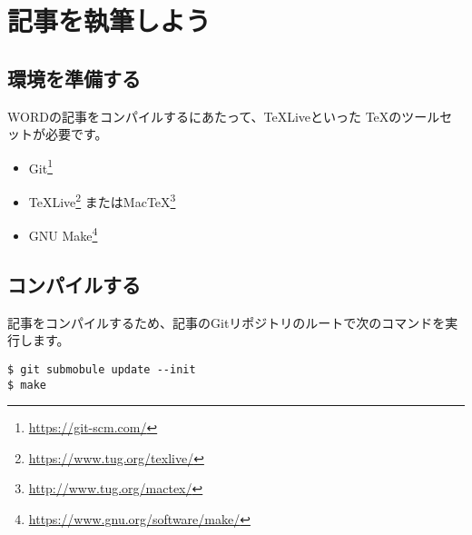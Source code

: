 \documentclass[../../main]{subfiles}
\begin{document}
\lstset{
  basicstyle=\ttfamily,
  commentstyle=\textit,
  frame=trBL,
  numbers=left,
  breaklines=true,
  title=\lstname,
}



\renewcommand{\thelstlisting}{\arabic{lstlisting}}

\subtitle{ヘッダの見出し}


\author{情報 太郎}

\chapter{記事を執筆しよう}

\section{環境を準備する}

WORDの記事をコンパイルするにあたって、\TeX Liveといった
\TeX のツールセットが必要です。

\begin{itemize}
  \item Git\footnote{\url{https://git-scm.com/}}
  \item \TeX Live\footnote{\url{https://www.tug.org/texlive/}}
  またはMac\TeX\footnote{\url{http://www.tug.org/mactex/}}
  \item GNU Make\footnote{\url{https://www.gnu.org/software/make/}}
\end{itemize}

\section{コンパイルする}
\label{sec:compile}

記事をコンパイルするため、記事のGitリポジトリのルートで次のコマンドを実行します。

\begin{lstlisting}
$ git submobule update --init
$ make
\end{lstlisting}
\end{document}
